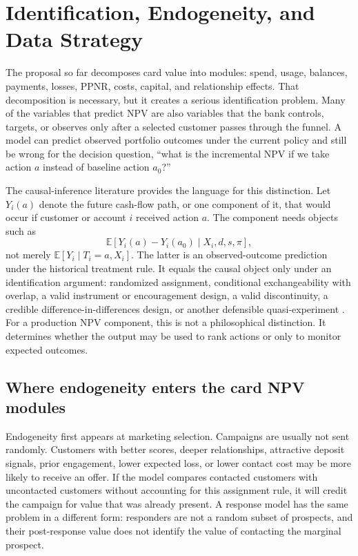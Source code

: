 \documentclass[11pt]{article}
\newcommand{\E}{\mathbb{E}}
\newcommand{\1}{\mathbf{1}}
\begin{document}
\section{Identification, Endogeneity, and Data Strategy}
\label{sec:identification-data}

The proposal so far decomposes card value into modules: spend, usage,
balances, payments, losses, PPNR, costs, capital, and relationship effects.
That decomposition is necessary, but it creates a serious identification
problem. Many of the variables that predict NPV are also variables that the
bank controls, targets, or observes only after a selected customer passes
through the funnel. A model can predict observed portfolio outcomes under the
current policy and still be wrong for the decision question, ``what is the
incremental NPV if we take action $a$ instead of baseline action $a_0$?''

The causal-inference literature provides the language for this distinction.
Let $Y_i(a)$ denote the future cash-flow path, or one component of it, that
would occur if customer or account $i$ received action $a$. The component
needs objects such as
\begin{equation}
  \E\!\left[Y_i(a)-Y_i(a_0)\mid X_i, d, s, \pi\right],
  \label{eq:causal-cashflow-object}
\end{equation}
not merely $\E[Y_i\mid T_i=a,X_i]$. The latter is an observed-outcome
prediction under the historical treatment rule. It equals the causal object
only under an identification argument: randomized assignment, conditional
exchangeability with overlap, a valid instrument or encouragement design, a
valid discontinuity, a credible difference-in-differences design, or another
defensible quasi-experiment \citep{rosenbaum1983propensity,
imbensrubin2015causal,angrist2009mostlyharmless,imbenswooldridge2009recent,
hernanrobins2020causal}. For a production NPV component, this is not a
philosophical distinction. It determines whether the output may be used to
rank actions or only to monitor expected outcomes.

\subsection{Where endogeneity enters the card NPV modules}

Endogeneity first appears at marketing selection. Campaigns are usually not
sent randomly. Customers with better scores, deeper relationships, attractive
deposit signals, prior engagement, lower expected loss, or lower contact cost
may be more likely to receive an offer. If the model compares contacted
customers with uncontacted customers without accounting for this assignment
rule, it will credit the campaign for value that was already present. A
response model has the same problem in a different form: responders are not a
random subset of prospects, and their post-response value does not identify the
value of contacting the marginal prospect.
\end{document}
